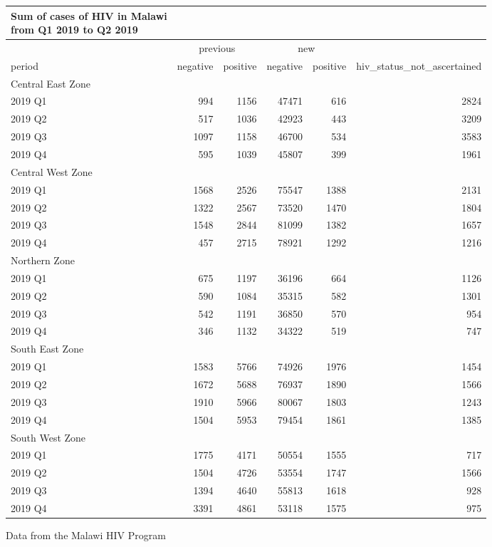 \documentclass[
]{article}
\begin{document}
\setlength{\LTpost}{0mm}
\begin{longtable}{lrrrrr}
\caption*{
{\large Sum of cases of HIV in Malawi} \\ 
{\small from Q1 2019 to Q2 2019}
} \\ 
\toprule
 & \multicolumn{2}{c}{previous} & \multicolumn{2}{c}{new} &  \\ 
\cmidrule(lr){2-3} \cmidrule(lr){4-5}
period & negative & positive & negative & positive & hiv\_status\_not\_ascertained \\ 
\midrule
\multicolumn{6}{l}{Central East Zone} \\ 
\midrule
2019 Q1 & 994 & 1156 & 47471 & 616 & 2824 \\ 
2019 Q2 & 517 & 1036 & 42923 & 443 & 3209 \\ 
2019 Q3 & 1097 & 1158 & 46700 & 534 & 3583 \\ 
2019 Q4 & 595 & 1039 & 45807 & 399 & 1961 \\ 
\midrule
\multicolumn{6}{l}{Central West Zone} \\ 
\midrule
2019 Q1 & 1568 & 2526 & 75547 & 1388 & 2131 \\ 
2019 Q2 & 1322 & 2567 & 73520 & 1470 & 1804 \\ 
2019 Q3 & 1548 & 2844 & 81099 & 1382 & 1657 \\ 
2019 Q4 & 457 & 2715 & 78921 & 1292 & 1216 \\ 
\midrule
\multicolumn{6}{l}{Northern Zone} \\ 
\midrule
2019 Q1 & 675 & 1197 & 36196 & 664 & 1126 \\ 
2019 Q2 & 590 & 1084 & 35315 & 582 & 1301 \\ 
2019 Q3 & 542 & 1191 & 36850 & 570 & 954 \\ 
2019 Q4 & 346 & 1132 & 34322 & 519 & 747 \\ 
\midrule
\multicolumn{6}{l}{South East Zone} \\ 
\midrule
2019 Q1 & 1583 & 5766 & 74926 & 1976 & 1454 \\ 
2019 Q2 & 1672 & 5688 & 76937 & 1890 & 1566 \\ 
2019 Q3 & 1910 & 5966 & 80067 & 1803 & 1243 \\ 
2019 Q4 & 1504 & 5953 & 79454 & 1861 & 1385 \\ 
\midrule
\multicolumn{6}{l}{South West Zone} \\ 
\midrule
2019 Q1 & 1775 & 4171 & 50554 & 1555 & 717 \\ 
2019 Q2 & 1504 & 4726 & 53554 & 1747 & 1566 \\ 
2019 Q3 & 1394 & 4640 & 55813 & 1618 & 928 \\ 
2019 Q4 & 3391 & 4861 & 53118 & 1575 & 975 \\ 
\bottomrule
\end{longtable}
\begin{minipage}{\linewidth}
Data from the Malawi HIV Program\\
\end{minipage}
\end{document}
